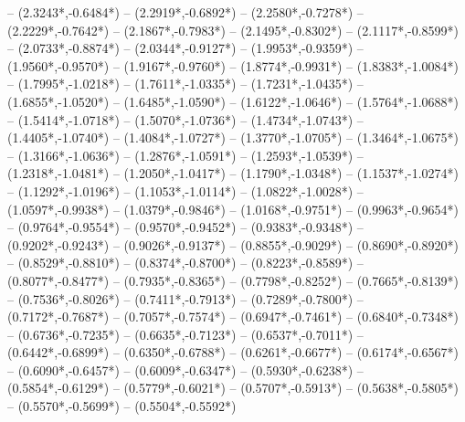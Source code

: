 {	-- ({2.3243*\dx},{-0.6484*\dy})
	-- ({2.2919*\dx},{-0.6892*\dy})
	-- ({2.2580*\dx},{-0.7278*\dy})
	-- ({2.2229*\dx},{-0.7642*\dy})
	-- ({2.1867*\dx},{-0.7983*\dy})
	-- ({2.1495*\dx},{-0.8302*\dy})
	-- ({2.1117*\dx},{-0.8599*\dy})
	-- ({2.0733*\dx},{-0.8874*\dy})
	-- ({2.0344*\dx},{-0.9127*\dy})
	-- ({1.9953*\dx},{-0.9359*\dy})
	-- ({1.9560*\dx},{-0.9570*\dy})
	-- ({1.9167*\dx},{-0.9760*\dy})
	-- ({1.8774*\dx},{-0.9931*\dy})
	-- ({1.8383*\dx},{-1.0084*\dy})
	-- ({1.7995*\dx},{-1.0218*\dy})
	-- ({1.7611*\dx},{-1.0335*\dy})
	-- ({1.7231*\dx},{-1.0435*\dy})
	-- ({1.6855*\dx},{-1.0520*\dy})
	-- ({1.6485*\dx},{-1.0590*\dy})
	-- ({1.6122*\dx},{-1.0646*\dy})
	-- ({1.5764*\dx},{-1.0688*\dy})
	-- ({1.5414*\dx},{-1.0718*\dy})
	-- ({1.5070*\dx},{-1.0736*\dy})
	-- ({1.4734*\dx},{-1.0743*\dy})
	-- ({1.4405*\dx},{-1.0740*\dy})
	-- ({1.4084*\dx},{-1.0727*\dy})
	-- ({1.3770*\dx},{-1.0705*\dy})
	-- ({1.3464*\dx},{-1.0675*\dy})
	-- ({1.3166*\dx},{-1.0636*\dy})
	-- ({1.2876*\dx},{-1.0591*\dy})
	-- ({1.2593*\dx},{-1.0539*\dy})
	-- ({1.2318*\dx},{-1.0481*\dy})
	-- ({1.2050*\dx},{-1.0417*\dy})
	-- ({1.1790*\dx},{-1.0348*\dy})
	-- ({1.1537*\dx},{-1.0274*\dy})
	-- ({1.1292*\dx},{-1.0196*\dy})
	-- ({1.1053*\dx},{-1.0114*\dy})
	-- ({1.0822*\dx},{-1.0028*\dy})
	-- ({1.0597*\dx},{-0.9938*\dy})
	-- ({1.0379*\dx},{-0.9846*\dy})
	-- ({1.0168*\dx},{-0.9751*\dy})
	-- ({0.9963*\dx},{-0.9654*\dy})
	-- ({0.9764*\dx},{-0.9554*\dy})
	-- ({0.9570*\dx},{-0.9452*\dy})
	-- ({0.9383*\dx},{-0.9348*\dy})
	-- ({0.9202*\dx},{-0.9243*\dy})
	-- ({0.9026*\dx},{-0.9137*\dy})
	-- ({0.8855*\dx},{-0.9029*\dy})
	-- ({0.8690*\dx},{-0.8920*\dy})
	-- ({0.8529*\dx},{-0.8810*\dy})
	-- ({0.8374*\dx},{-0.8700*\dy})
	-- ({0.8223*\dx},{-0.8589*\dy})
	-- ({0.8077*\dx},{-0.8477*\dy})
	-- ({0.7935*\dx},{-0.8365*\dy})
	-- ({0.7798*\dx},{-0.8252*\dy})
	-- ({0.7665*\dx},{-0.8139*\dy})
	-- ({0.7536*\dx},{-0.8026*\dy})
	-- ({0.7411*\dx},{-0.7913*\dy})
	-- ({0.7289*\dx},{-0.7800*\dy})
	-- ({0.7172*\dx},{-0.7687*\dy})
	-- ({0.7057*\dx},{-0.7574*\dy})
	-- ({0.6947*\dx},{-0.7461*\dy})
	-- ({0.6840*\dx},{-0.7348*\dy})
	-- ({0.6736*\dx},{-0.7235*\dy})
	-- ({0.6635*\dx},{-0.7123*\dy})
	-- ({0.6537*\dx},{-0.7011*\dy})
	-- ({0.6442*\dx},{-0.6899*\dy})
	-- ({0.6350*\dx},{-0.6788*\dy})
	-- ({0.6261*\dx},{-0.6677*\dy})
	-- ({0.6174*\dx},{-0.6567*\dy})
	-- ({0.6090*\dx},{-0.6457*\dy})
	-- ({0.6009*\dx},{-0.6347*\dy})
	-- ({0.5930*\dx},{-0.6238*\dy})
	-- ({0.5854*\dx},{-0.6129*\dy})
	-- ({0.5779*\dx},{-0.6021*\dy})
	-- ({0.5707*\dx},{-0.5913*\dy})
	-- ({0.5638*\dx},{-0.5805*\dy})
	-- ({0.5570*\dx},{-0.5699*\dy})
	-- ({0.5504*\dx},{-0.5592*\dy})
}
